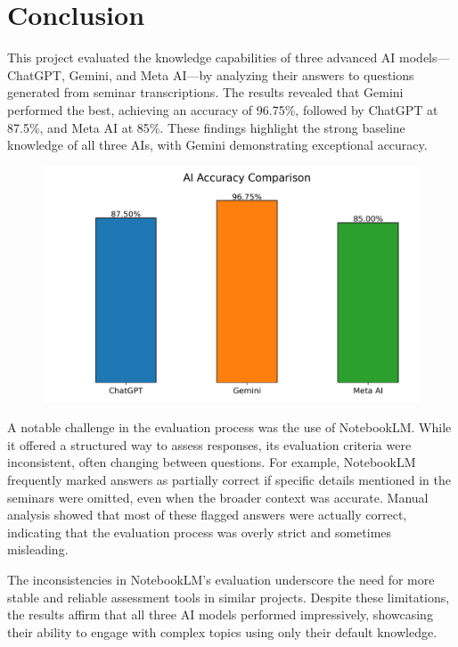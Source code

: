 \section{Conclusion}
This project evaluated the knowledge capabilities of three advanced AI models—ChatGPT, Gemini, and Meta AI—by 
analyzing their answers to questions generated from seminar transcriptions. The results revealed that Gemini performed 
the best, achieving an accuracy of 96.75\%, followed by ChatGPT at 87.5\%, and Meta AI at 85\%. 
These findings highlight the strong baseline knowledge of all three AIs, with Gemini demonstrating exceptional accuracy.
\begin{figure}[H]
    \centering
    \includegraphics[scale=0.75]{Imagens/graph.jpg}
\end{figure}
A notable challenge in the evaluation process was the use of NotebookLM. While it offered a structured way to assess responses,
its evaluation criteria were inconsistent, often changing between questions. For example, NotebookLM frequently marked
answers as partially correct if specific details mentioned in the seminars were omitted, even when the broader context 
was accurate. Manual analysis showed that most of these flagged answers were actually correct, indicating that the 
evaluation process was overly strict and sometimes misleading.

The inconsistencies in NotebookLM’s evaluation   underscore the need for more stable and reliable assessment tools
in similar projects. Despite these limitations, the results affirm that all three AI models performed impressively,
showcasing their ability to engage with complex topics using only their default knowledge.
